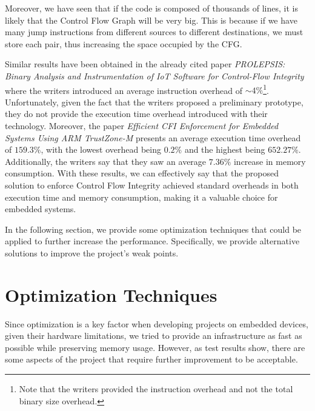 Moreover, we have seen that if the code is composed of thousands of lines, it is
likely that the Control Flow Graph will be very big. This is because if we have
many jump instructions from different sources to different destinations, we must
store each pair, thus increasing the space occupied by the CFG.

Similar results have been obtained in the already cited paper \textit{PROLEPSIS:
Binary Analysis and Instrumentation of IoT Software for Control-Flow Integrity}\cite{article2}
where the writers introduced an average instruction overhead of $\sim 4\%$\footnote{Note
that the writers provided the instruction overhead and not the total binary size
overhead.}. Unfortunately, given the fact that the writers proposed a preliminary
prototype, they do not provide the execution time overhead introduced with their
technology. Moreover, the paper \textit{Efficient CFI Enforcement for Embedded
Systems Using ARM TrustZone-M}\cite{article1} presents an average execution time
overhead of $1 59.3 \%$, with the lowest overhead being $0.2 \%$ and the highest
being $652.2 7 \%$. Additionally, the writers say that they saw an average $7.36\%$
increase in memory consumption. With these results, we can effectively say that the
proposed solution to enforce Control Flow Integrity achieved standard overheads in
both execution time and memory consumption, making it a valuable choice for
embedded systems.

In the following section, we provide some optimization techniques that could be applied
to further increase the performance. Specifically, we provide alternative solutions
to improve the project's weak points.

\section{Optimization Techniques}
\label{sec:pa_optimization}

Since optimization is a key factor when developing projects on embedded devices,
given their hardware limitations, we tried to provide an infrastructure as fast
as possible while preserving memory usage. However, as test results show, there are
some aspects of the project that require further improvement to be acceptable.

